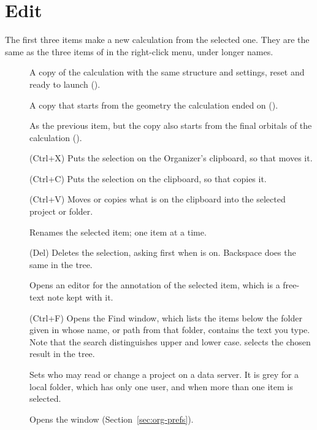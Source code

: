 \section{Edit}
The first three items make a new calculation from the selected one. They are the same as the three items of  in the right-click menu, under longer names.
\begin{description}
	\item[] A copy of the calculation with the same structure and settings, reset and ready to launch ().
	\item[] A copy that starts from the geometry the calculation ended on ().
	\item[] As the previous item, but the copy also starts from the final orbitals of the calculation ().
	\item[] (\textsf{Ctrl+X}) Puts the selection on the Organizer's clipboard, so that  moves it.
	\item[] (\textsf{Ctrl+C}) Puts the selection on the clipboard, so that  copies it.
	\item[] (\textsf{Ctrl+V}) Moves or copies what is on the clipboard into the selected project or folder.
	\item[] Renames the selected item; one item at a time.
	\item[] (\textsf{Del}) Deletes the selection, asking first when  is on. Backspace does the same in the tree.
	\item[] Opens an editor for the annotation of the selected item, which is a free-text note kept with it.
	\item[] (\textsf{Ctrl+F}) Opens the Find window, which lists the items below the folder given in  whose name, or path from that folder, contains the text you type. Note that the search distinguishes upper and lower case.  selects the chosen result in the tree.
	\item[] Sets who may read or change a project on a data server. It is grey for a local folder, which has only one user, and when more than one item is selected.
	\item[] Opens the  window (Section~\ref{sec:org-prefs}).
\end{description}

